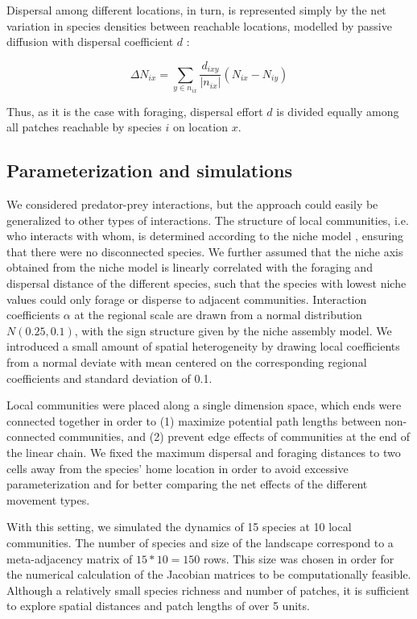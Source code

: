 Dispersal among different locations, in turn, is represented simply by the net variation in species densities between reachable locations, modelled by passive diffusion with dispersal coefficient $d$ \citep{Gravel2016a}:

\begin{equation}
\Delta N_{ix} = \sum_{y \in n_{ix}} \frac{d_{ixy}}{\vert n_{ix} \vert} (N_{ix} - N_{iy})
\end{equation}

Thus, as it is the case with foraging, dispersal effort $d$ is divided equally among all patches reachable by species $i$ on location $x$.

\subsection*{Parameterization and simulations}

We considered predator-prey interactions, but the approach could easily be generalized to other types of interactions. The structure of local communities, i.e. who interacts with whom, is determined according to the niche model \citep{Williams2000}, ensuring that there were no disconnected species. We further assumed that the niche axis obtained from the niche model is linearly correlated with the foraging and dispersal distance of the different species, such that the species with lowest niche values could only forage or disperse to adjacent communities. Interaction coefficients $\alpha$ at the regional scale are drawn from a normal distribution $N(0.25,0.1)$, with the sign structure given by the niche assembly model. We introduced a small amount of spatial heterogeneity by drawing local coefficients from a normal deviate with mean centered on the corresponding regional coefficients and standard deviation of 0.1.

Local communities were placed along a single dimension space, which ends were connected together in order to (1) maximize potential path lengths between non-connected communities, and (2) prevent edge effects of communities at the end of the linear chain. We fixed the maximum dispersal and foraging distances to two cells away from the species' home location in order to avoid excessive parameterization and for better comparing the net effects of the different movement types.

With this setting, we simulated the dynamics of 15 species at 10 local communities. The number of species and size of the landscape correspond to a meta-adjacency matrix of $15*10 = 150$ rows. This size was chosen in order for the numerical calculation of the Jacobian matrices to be computationally feasible. Although a relatively small species richness and number of patches, it is sufficient to explore spatial distances and patch lengths of over 5 units.

